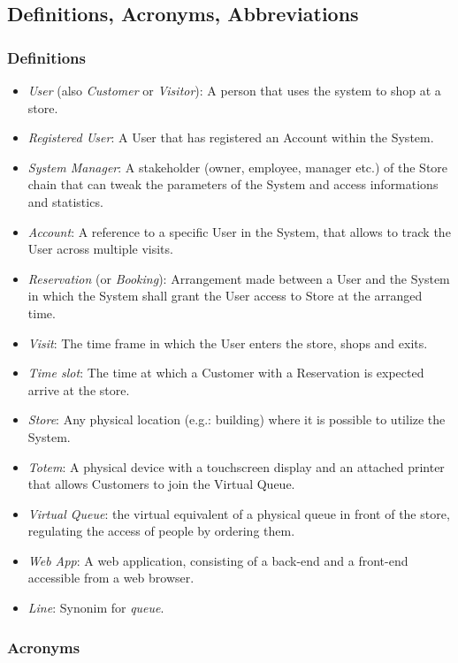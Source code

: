 \subsection{Definitions, Acronyms, Abbreviations}

\subsubsection{Definitions}

\begin{itemize}
    \item \emph{User} (also \emph{Customer} or \emph{Visitor}): A person that uses the system to shop at a store.
    \item \emph{Registered User}: A User that has registered an Account within the System.
    \item \emph{System Manager}: A stakeholder (owner, employee, manager etc.) of the Store chain that can tweak the parameters of the System and access informations and statistics.
    \item \emph{Account}: A reference to a specific User in the System, that allows to track the User across multiple visits.
    \item \emph{Reservation} (or \emph{Booking}): Arrangement made between a User and the System in which the System shall grant the User access to Store at the arranged time.
    \item \emph{Visit}: The time frame in which the User enters the store, shops and exits.
    \item \emph{Time slot}: The time at which a Customer with a Reservation is expected arrive at the store.
    \item \emph{Store}: Any physical location (e.g.: building) where it is possible to utilize the System.
    \item \emph{Totem}: A physical device with a touchscreen display and an attached printer that allows Customers to join the Virtual Queue.
    \item \emph{Virtual Queue}: the virtual equivalent of a physical queue in front of the store, regulating the access of people by ordering them.
    \item \emph{Web App}: A web application, consisting of a back-end and a front-end accessible from a web browser.
    \item \emph{Line}: Synonim for \emph{queue}.
\end{itemize}

\subsubsection{Acronyms}

